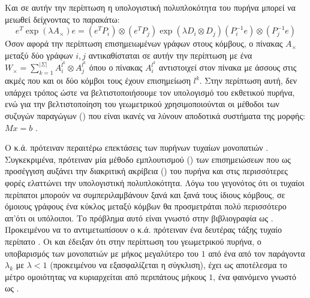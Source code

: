Και σε αυτήν την περίπτωση η υπολογιστική πολυπλοκότητα του πυρήνα μπορεί να μειωθεί δείχνοντας το παρακάτω:
\begin{equation}
    e^T\exp(\lambda A_{\times}) e = (e^T P_{i}) \otimes (e^T P_{j})\exp(\lambda D_{i} \otimes D_{j}) (P_{i}^{-1} e) \otimes (P_{j}^{-1} e)
\end{equation}
Όσον αφορά την περίπτωση επισημειωμένων γράφων στους κόμβους, ο πίνακας $Α_{\times}$ μεταξύ δύο γράφων $i, j$ αντικαθίσταται σε αυτήν την περίπτωση με ένα $W_{\times} = \sum_{k=1}^{|\Sigma|}A_{i}^{l^{k}}\otimes A_{j}^{l^{k}}$ όπου ο πίνακας $A_{i}^{l^{k}}$ αντιστοιχεί στον πίνακα με άσσους στις ακμές που και οι δύο κόμβοι τους έχουν επισημείωση $l^{k}$.
Στην περίπτωση αυτή, δεν υπάρχει τρόπος ώστε να βελτιστοποιήσουμε τον υπολογισμό του εκθετικού πυρήνα, ενώ για την βελτιστοποίηση του γεωμετρικού χρησιμοποιούνται οι μέθοδοι των συζυγών παραγώγων () που είναι ικανές να λύνουν αποδοτικά συστήματα της μορφής: $Mx = b$ \cite{cgm}.\par
Ο  κ.ά. πρότειναν περαιτέρω επεκτάσεις των πυρήνων τυχαίων μονοπατιών \cite{mahe2004extensions}.
Συγκεκριμένα, πρότειναν μία μέθοδο εμπλουτισμού () των επισημειώσεων που ως προσέγγιση αυξάνει την διακριτική ακρίβεια () του πυρήνα και στις περισσότερες φορές ελαττώνει την υπολογιστική πολυπλοκότητα.
Λόγω του γεγονότος ότι οι τυχαίοι περίπατοι μπορούν να συμπεριλαμβάνουν ξανά και ξανά τους ίδιους κόμβους, σε όμοιους γράφους ένα κύκλος μεταξύ κόμβων θα προσμετράται πολύ περισσότερο απ'ότι οι υπόλοιποι. Το πρόβλημα αυτό είναι γνωστό στην βιβλιογραφία ως .
Προκειμένου να το αντιμετωπίσουν ο  κ.ά. πρότειναν ένα δευτέρας τάξης τυχαίο περίπατο .
Οι  και  έδειξαν ότι στην περίπτωση του γεωμετρικού πυρήνα, ο υποβαρισμός των μονοπατιών με μήκος μεγαλύτερο του $1$ από ένα από τον παράγοντα $λ_{k}$ με $λ<1$ (προκειμένου να εξασφαλίζεται η σύγκλιση), έχει ως αποτέλεσμα το μέτρο ομοιότητας να κυριαρχείται από περιπάτους μήκους $1$, ένα φαινόμενο γνωστό ως  \cite{sugiyama2015halting}.

